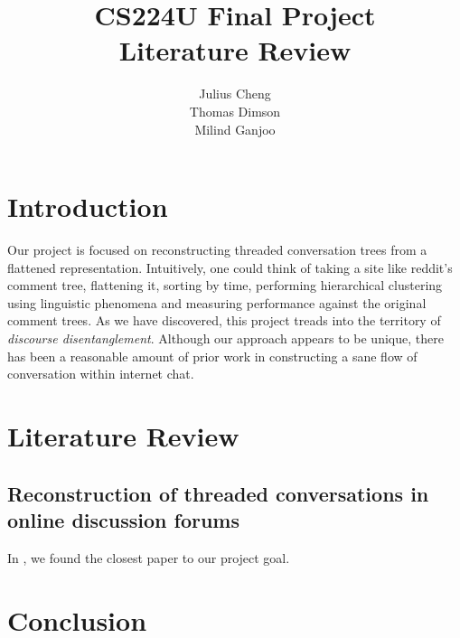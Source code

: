 \documentclass{article}
\title{CS224U Final Project \\Literature Review}
\author{Julius Cheng\\ Thomas Dimson \\ Milind Ganjoo}
\begin{document}
\maketitle

\section{Introduction}
Our project is focused on reconstructing threaded conversation trees
from a flattened representation. Intuitively, one could think of 
taking a site like reddit's comment tree, flattening it, sorting by time, performing
hierarchical clustering using linguistic phenomena and measuring performance against the original comment trees. As we have
discovered, this project treads into the territory of \textit{discourse disentanglement}.
Although our approach appears to be unique, there has been a reasonable
amount of prior work in constructing a sane flow of conversation within internet chat.

\section{Literature Review}
\subsection{Reconstruction of threaded conversations in online discussion forums}
In \cite{Aumayr2011a}, we found the closest paper to our project goal.


\section{Conclusion}

{}

\end{document}
